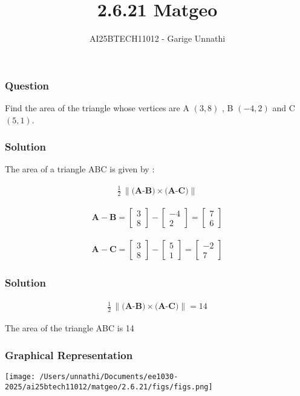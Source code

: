 \documentclass{beamer}
\title{2.6.21 Matgeo}
\author{AI25BTECH11012 - Garige Unnathi}
\date{}
\begin{document}
\frame{\titlepage}

\begin{frame}
\frametitle{Question}
Find the area of the triangle whose vertices are A $(3,8)$ , B $(-4,2)$ and C $(5,1)$.\\
\end{frame}


\begin{frame}
\frametitle{Solution}
The area of a triangle ABC is given by :

\begin{align*}
\frac{1}{2}\,\lVert \textbf{(A-B)}\times\textbf{(A-C)}\rVert
\end{align*}


\begin{align}
   \textbf{A}-\textbf{B} = \begin{bmatrix}3 \\ 8\end{bmatrix} - \begin{bmatrix}-4 \\ 2\end{bmatrix} = \begin{bmatrix}7 \\ 6\end{bmatrix} 
\end{align}

\begin{align}
   \textbf{A}-\textbf{C} = \begin{bmatrix}3 \\ 8\end{bmatrix} - \begin{bmatrix}5 \\ 1\end{bmatrix} = \begin{bmatrix}-2 \\ 7\end{bmatrix}
\end{align}
\end{frame}



\begin{frame}
\frametitle{Solution}
\begin{align}
\frac{1}{2}\,\lVert \textbf{(A-B)}\times\textbf{(A-C)}\rVert
 = 14
\end{align}

\bigskip
The area of the triangle ABC is 14

\end{frame}

\begin{frame}

\frametitle{Graphical Representation}
\begin{center}
\texttt{[image: /Users/unnathi/Documents/ee1030-2025/ai25btech11012/matgeo/2.6.21/figs/figs.png]}
\end{center}
\end{frame}
\end{document}
